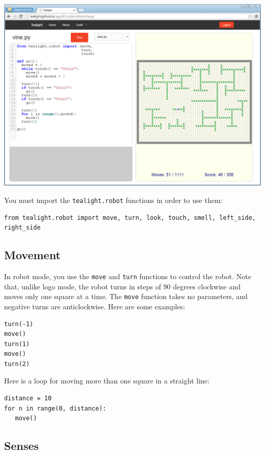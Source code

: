 \documentclass[12pt,a4paper,twoside]{article}
\renewcommand{\_}{\texttt{\symbol{95}}}
\begin{document}
\begin{center}
\includegraphics[scale=0.5,angle=0]{screenshots/ide/robot}
\end{center}

You must import the \verb^tealight.robot^ functions in order to use them:

\begin{verbatim}
from tealight.robot import move, turn, look, touch, smell, left_side, right_side
\end{verbatim}

\subsection{Movement}

In robot mode, you use the \verb^move^ and \verb^turn^
functions to control the robot. Note that, unlike logo mode, the robot turns in steps of 90 degrees clockwise and moves only one square at a time. The \verb^move^ function takes no parameters, and negative turns are anticlockwise. Here are some examples:

\begin{verbatim}
turn(-1)
move()
turn(1)
move()
turn(2)
\end{verbatim}


Here is a loop for moving more than one square
in a straight line:

\begin{verbatim}
distance = 10
for n in range(0, distance):
   move()

\end{verbatim}

\subsection{Senses}
\end{document}
